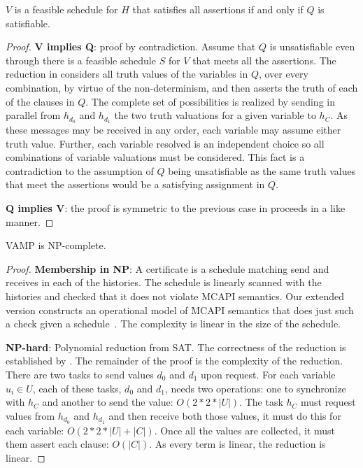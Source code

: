 \begin{lemma} \label{lem:sat}
$V$ is a feasible schedule for $H$ that satisfies all assertions if
  and only if $Q$ is satisfiable.
\end{lemma}
\begin{proof}
\textbf{V implies Q}: proof by contradiction. Assume that $Q$ is
unsatisfiable even through there is a feasible schedule $S$ for $V$
that meets all the assertions. The reduction in 
considers all truth values of the variables in $Q$, over every
combination, by virtue of the non-determinism, and then asserts the
truth of each of the clauses in $Q$. The complete set of possibilities
is realized by sending in parallel from $h_{d_0}$ and $h_{d_1}$ the
two truth valuations for a given variable to $h_C$. As these messages
may be received in any order, each variable may assume either truth
value. Further, each variable resolved is an independent choice so all
combinations of variable valuations must be considered.  This fact is
a contradiction to the assumption of $Q$ being unsatisfiable as the
same truth values that meet the assertions would be a satisfying
assignment in $Q$.

\noindent \textbf{Q implies V}: the proof is symmetric to the previous case in
proceeds in a like manner.
\end{proof}

\begin{theorem}[NP-complete]
VAMP is NP-complete.
\end{theorem}
\begin{proof}
\noindent\textbf{Membership in NP}: A certificate is a schedule
matching send and receives in each of the histories. The schedule is
linearly scanned with the histories and checked that it does not
violate MCAPI semantics. Our extended version constructs an
operational model of MCAPI semantics that does just such a check given
a schedule~\cite{extended-version}. The complexity is linear in the
size of the schedule.

\noindent\textbf{NP-hard}: Polynomial reduction from SAT. The
correctness of the reduction is established by .
The remainder of the proof is the complexity of the reduction. There
are two tasks to send values $d_0$ and $d_1$ upon request. For each
variable $u_i \in U$, each of these tasks, $d_0$ and $d_1$, needs two
operations: one to synchronize with $h_C$ and another to send the
value: $O(2 * 2 * |U|)$. The task $h_C$ must request values from
$h_{d_0}$ and $h_{d_1}$ and then receive both those values, it must do
this for each variable: $O(2 * 2 * |U| + |C|)$.  Once all the values
are collected, it must them assert each clause: $O(|C|)$. As every
term is linear, the reduction is linear.
\end{proof}
